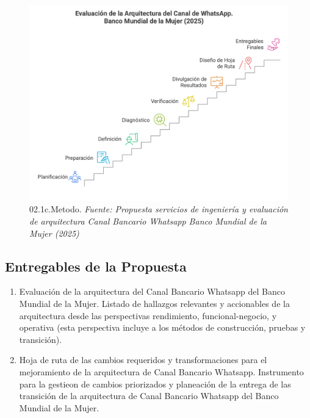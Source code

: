 \documentclass[
  paper=a4,
  ,captions=tableheading
]{scrartcl}
\providecommand{\tightlist}{%
  \setlength{\itemsep}{0pt}\setlength{\parskip}{0pt}}
\renewenvironment{quote}{\begin{customblockquote}\list{}{\rightmargin=0em\leftmargin=0em}%
\item\relax\color{blockquote-text}\ignorespaces}{\unskip\unskip\endlist\end{customblockquote}}
\begin{document}
\begin{figure}
\centering
\includegraphics{images/02.1c.Metodo.png}
\caption{02.1c.Metodo. \emph{Fuente: Propuesta servicios de ingeniería y
evaluación de arquitectura Canal Bancario Whatsapp Banco Mundial de la
Mujer (2025)}}\label{fig:id-ecb3efe1a4e14dd389ece75370f1861c}
\end{figure}

\subsection{Entregables de la
Propuesta}\label{sec:entregables-de-la-propuesta}

\begin{quote}
\end{quote}

\begin{enumerate}
\def\labelenumi{\arabic{enumi}.}
\tightlist
\item
  Evaluación de la arquitectura del Canal Bancario Whatsapp del Banco
  Mundial de la Mujer. Listado de hallazgos relevantes y accionables de
  la arquitectura desde las perspectivas rendimiento, funcional-negocio,
  y operativa (esta perspectiva incluye a los métodos de construcción,
  pruebas y transición).
\item
  Hoja de ruta de las cambios requeridos y transformaciones para el
  mejoramiento de la arquitectura de Canal Bancario Whatsapp.
  Instrumento para la gestieon de cambios priorizados y planeación de la
  entrega de las transición de la arquitectura de Canal Bancario
  Whatsapp del Banco Mundial de la Mujer.
\end{enumerate}
\end{document}

